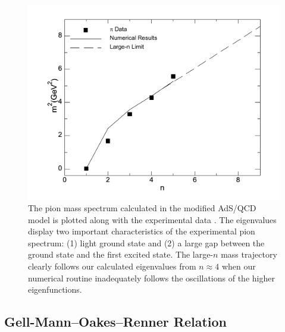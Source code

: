 \begin{figure}[htb]
\begin{center}
\includegraphics[scale=0.42]{linear.pdf}
\caption{The pion mass spectrum calculated in the modified AdS/QCD model is plotted along with the experimental data \cite{pdg}. 
The eigenvalues display two important characteristics of the experimental pion spectrum: (1) light ground state and (2) a large gap between the ground state and the first excited state. 
The large-$n$ mass trajectory clearly follows our calculated eigenvalues from $n\approx 4$ when our numerical routine inadequately follows the oscillations of the higher eigenfunctions.}
\label{fig:mass}
\end{center}
\end{figure}

\subsection{Gell-Mann--Oakes--Renner Relation}

